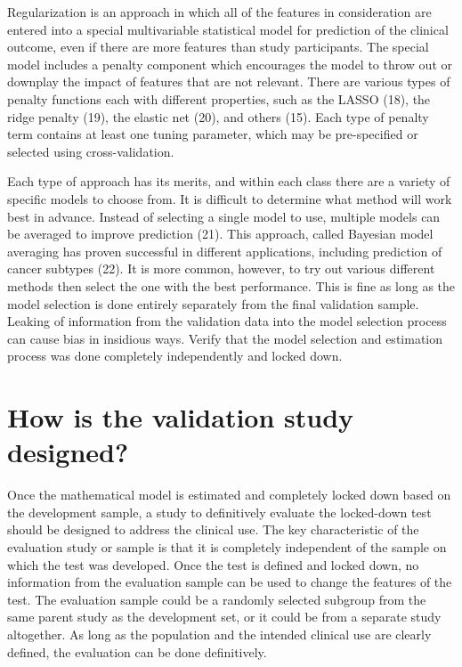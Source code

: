 \documentclass[11pt]{article}
\begin{document}
Regularization is an approach in which all of the features in
consideration are entered into a special multivariable statistical model
for prediction of the clinical outcome, even if there are more features
than study participants. The special model includes a penalty component
which encourages the model to throw out or downplay the impact of
features that are not relevant. There are various types of penalty
functions each with different properties, such as the LASSO (18), the
ridge penalty (19), the elastic net (20), and others (15). Each type of
penalty term contains at least one tuning parameter, which may be
pre-specified or selected using cross-validation.

Each type of approach has its merits, and within each class there are a
variety of specific models to choose from. It is difficult to determine
what method will work best in advance. Instead of selecting a single
model to use, multiple models can be averaged to improve prediction
(21). This approach, called Bayesian model averaging has proven
successful in different applications, including prediction of cancer
subtypes (22). It is more common, however, to try out various different
methods then select the one with the best performance. This is fine as
long as the model selection is done entirely separately from the final
validation sample. Leaking of information from the validation data into
the model selection process can cause bias in insidious ways. Verify
that the model selection and estimation process was done completely
independently and locked down.

\section{How is the validation study
designed?}\label{how-is-the-validation-study-designed}

Once the mathematical model is estimated and completely locked down
based on the development sample, a study to definitively evaluate the
locked-down test should be designed to address the clinical use. The key
characteristic of the evaluation study or sample is that it is
completely independent of the sample on which the test was developed.
Once the test is defined and locked down, no information from the
evaluation sample can be used to change the features of the test. The
evaluation sample could be a randomly selected subgroup from the same
parent study as the development set, or it could be from a separate
study altogether. As long as the population and the intended clinical
use are clearly defined, the evaluation can be done definitively.
\end{document}
